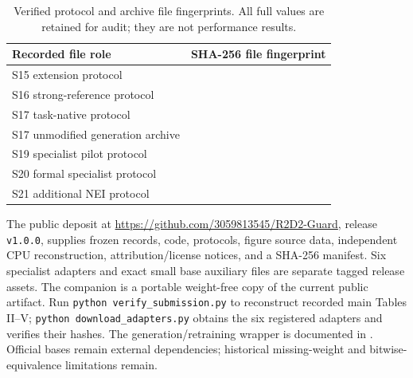 \documentclass[journal,onecolumn]{IEEEtran}
\begin{document}
\begin{table}[H]
\centering\footnotesize
\caption{Verified protocol and archive file fingerprints. All full values are retained for audit; they are not performance results.}\label{tab:integrity-identifiers}
\setlength{\tabcolsep}{4pt}
\begin{tabular}{@{}L{5.2cm}L{10.0cm}@{}}
\toprule
Recorded file role & SHA-256 file fingerprint\\
\midrule
S15 extension protocol & {\scriptsize{}}\\
S16 strong-reference protocol & {\scriptsize{}}\\
S17 task-native protocol & {\scriptsize{}}\\
S17 unmodified generation archive & {\scriptsize{}}\\
S19 specialist pilot protocol & {\scriptsize{}}\\
S20 formal specialist protocol & {\scriptsize{}}\\
S21 additional NEI protocol & {\scriptsize{}}\\
\bottomrule
\end{tabular}
\end{table}


The public deposit at \url{https://github.com/3059813545/R2D2-Guard}, release \texttt{v1.0.0}, supplies frozen records, code, protocols, figure source data, independent CPU reconstruction, attribution/license notices, and a SHA-256 manifest. Six specialist adapters and exact small base auxiliary files are separate tagged release assets. The companion  is a portable weight-free copy of the current public artifact. Run \texttt{python verify\_submission.py} to reconstruct recorded main Tables II--V; \texttt{python download\_adapters.py} obtains the six registered adapters and verifies their hashes. The generation/retraining wrapper is documented in . Official bases remain external dependencies; historical missing-weight and bitwise-equivalence limitations remain.
\end{document}
